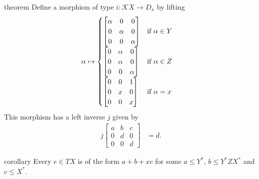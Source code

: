 \documentclass[a4paper,UKenglish,cleveref, autoref, thm-restate]{lipics-v2021}
\begin{document}
\begin{theoremEnd}{theorem}
  \label{thm:derivative}
  Define a morphism of type $i : \mathcal{K}X  \to  D_x$ by lifting
  \begin{align*}
     \alpha  &  \mapsto  \begin{cases}
            \begin{bmatrix}
               \alpha  & 0 & 0\\
              0 &  \alpha  & 0 \\
              0 & 0 &  \alpha 
            \end{bmatrix}
            & \text{if $ \alpha   \in  Y$} \\
            \begin{bmatrix}
              0 &  \alpha  & 0  \\
              0 &  \alpha  & 0 \\
              0 & 0 &  \alpha 
            \end{bmatrix} &
            \text{if $ \alpha   \in  Z$} \\
            \begin{bmatrix}
              0 & 0 & 1 \\
              0 & x & 0 \\
              0 & 0 & x
            \end{bmatrix} &
            \text{if $ \alpha  = x$}
          \end{cases}
  \end{align*}
  This morphism has a left inverse $j$ given by
  \begin{align*}
    j
    \begin{bmatrix}
      a & b & c\\
      0 & d & 0 \\
      0 & 0 & d
    \end{bmatrix}
    & = d.
  \end{align*}
\end{theoremEnd}

\begin{theoremEnd}{corollary}
  Every $e  \in  TX$ is of the form $a + b + xc$ for some $a  \leq  Y^*$, $b  \leq  Y^*ZX^*$
  and $c  \leq  X^*$.
\end{theoremEnd}
\end{document}
